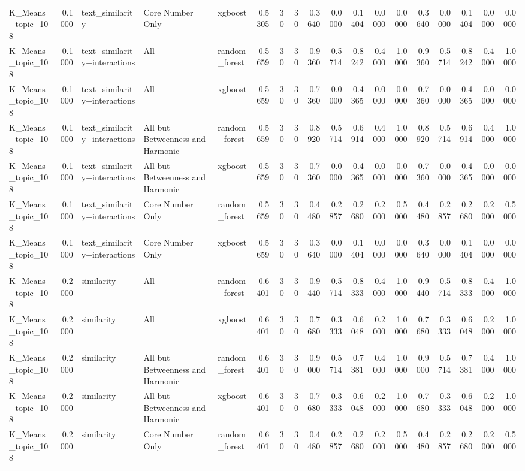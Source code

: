 \begin{tabular}{lrlllrrrrrrrrrrrrr}
K_Means_topic_108 & 0.1000 & text_similarity & Core Number Only & xgboost & 0.5305 & 30 & 30 & 0.3640 & 0.0000 & 0.1404 & 0.0000 & 0.0000 & 0.3640 & 0.0000 & 0.1404 & 0.0000 & 0.0000 \\
K_Means_topic_108 & 0.1000 & text_similarity+interactions & All & random_forest & 0.5659 & 30 & 30 & 0.9360 & 0.5714 & 0.8242 & 0.4000 & 1.0000 & 0.9360 & 0.5714 & 0.8242 & 0.4000 & 1.0000 \\
K_Means_topic_108 & 0.1000 & text_similarity+interactions & All & xgboost & 0.5659 & 30 & 30 & 0.7360 & 0.0000 & 0.4365 & 0.0000 & 0.0000 & 0.7360 & 0.0000 & 0.4365 & 0.0000 & 0.0000 \\
K_Means_topic_108 & 0.1000 & text_similarity+interactions & All but Betweenness and Harmonic & random_forest & 0.5659 & 30 & 30 & 0.8920 & 0.5714 & 0.6914 & 0.4000 & 1.0000 & 0.8920 & 0.5714 & 0.6914 & 0.4000 & 1.0000 \\
K_Means_topic_108 & 0.1000 & text_similarity+interactions & All but Betweenness and Harmonic & xgboost & 0.5659 & 30 & 30 & 0.7360 & 0.0000 & 0.4365 & 0.0000 & 0.0000 & 0.7360 & 0.0000 & 0.4365 & 0.0000 & 0.0000 \\
K_Means_topic_108 & 0.1000 & text_similarity+interactions & Core Number Only & random_forest & 0.5659 & 30 & 30 & 0.4480 & 0.2857 & 0.2680 & 0.2000 & 0.5000 & 0.4480 & 0.2857 & 0.2680 & 0.2000 & 0.5000 \\
K_Means_topic_108 & 0.1000 & text_similarity+interactions & Core Number Only & xgboost & 0.5659 & 30 & 30 & 0.3640 & 0.0000 & 0.1404 & 0.0000 & 0.0000 & 0.3640 & 0.0000 & 0.1404 & 0.0000 & 0.0000 \\
K_Means_topic_108 & 0.2000 & similarity & All & random_forest & 0.6401 & 30 & 30 & 0.9440 & 0.5714 & 0.8333 & 0.4000 & 1.0000 & 0.9440 & 0.5714 & 0.8333 & 0.4000 & 1.0000 \\
K_Means_topic_108 & 0.2000 & similarity & All & xgboost & 0.6401 & 30 & 30 & 0.7680 & 0.3333 & 0.6048 & 0.2000 & 1.0000 & 0.7680 & 0.3333 & 0.6048 & 0.2000 & 1.0000 \\
K_Means_topic_108 & 0.2000 & similarity & All but Betweenness and Harmonic & random_forest & 0.6401 & 30 & 30 & 0.9000 & 0.5714 & 0.7381 & 0.4000 & 1.0000 & 0.9000 & 0.5714 & 0.7381 & 0.4000 & 1.0000 \\
K_Means_topic_108 & 0.2000 & similarity & All but Betweenness and Harmonic & xgboost & 0.6401 & 30 & 30 & 0.7680 & 0.3333 & 0.6048 & 0.2000 & 1.0000 & 0.7680 & 0.3333 & 0.6048 & 0.2000 & 1.0000 \\
K_Means_topic_108 & 0.2000 & similarity & Core Number Only & random_forest & 0.6401 & 30 & 30 & 0.4480 & 0.2857 & 0.2680 & 0.2000 & 0.5000 & 0.4480 & 0.2857 & 0.2680 & 0.2000 & 0.5000 \\

\end{tabular}
